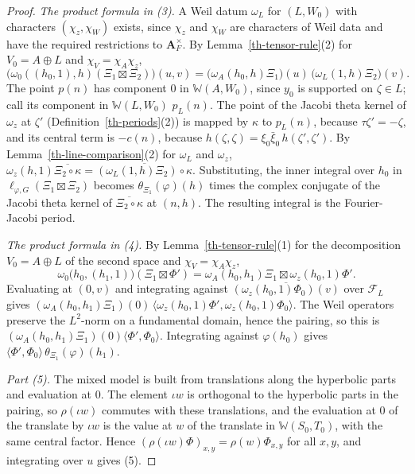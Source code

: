 \begin{proof}
\emph{The product formula in (3).} A Weil datum $\omega_L$ for $(L,W_0)$ with
characters $(\chi_z,\chi_W)$ exists, since $\chi_z$ and $\chi_W$ are characters
of Weil data and have the required restrictions to $\mathbf A_F^\times$. By
Lemma~\ref{th-tensor-rule}(2) for $V_0=A\oplus L$ and $\chi_V=\chi_A\chi_z$,
\[
\bigl(\omega_0((h_0,1),h)(\Xi_1\boxtimes\Xi_2)\bigr)(u,v)=\bigl(\omega_A(h_0,h)\Xi_1\bigr)(u)\,\bigl(\omega_L(1,h)\Xi_2\bigr)(v).
\]
The point $p(n)$ has component $0$ in $\mathbb W(A,W_0)$, since $y_0$ is
supported on $\zeta\in L$; call its component in $\mathbb W(L,W_0)$ $p_L(n)$.
The point of the Jacobi theta kernel of $\omega_z$ at $\zeta'$
(Definition~\ref{th-periods}(2)) is mapped by $\kappa$ to $p_L(n)$, because
$\tau\zeta'=-\zeta$, and its central term is $-c(n)$, because
$h(\zeta,\zeta)=\xi_0\bar\xi_0\,h(\zeta',\zeta')$. By
Lemma~\ref{th-line-comparison}(2) for $\omega_L$ and $\omega_z$,
$\omega_z(h,1)\overline{\Xi_2\circ\kappa}=\overline{(\omega_L(1,h)\Xi_2)\circ\kappa}$.
Substituting, the inner integral over $h_0$ in $\ell_{\varphi,G}(\Xi_1\boxtimes\Xi_2)$
becomes $\theta_{\Xi_1}(\varphi)(h)$ times the complex conjugate of the Jacobi
theta kernel of $\overline{\Xi_2\circ\kappa}$ at $(n,h)$. The resulting integral is
the Fourier-Jacobi period.

\emph{The product formula in (4).} By Lemma~\ref{th-tensor-rule}(1) for the
decomposition $V_0=A\oplus L$ of the second space and $\chi_V=\chi_A\chi_z$,
\[
\omega_0\bigl(h_0,(h_1,1)\bigr)(\Xi_1\boxtimes\Phi')=\omega_A(h_0,h_1)\Xi_1\boxtimes\omega_z(h_0,1)\Phi' .
\]
Evaluating at $(0,v)$ and integrating against
$\overline{(\omega_z(h_0,1)\Phi_0)(v)}$ over $\mathcal F_L$ gives
$(\omega_A(h_0,h_1)\Xi_1)(0)\,\langle\omega_z(h_0,1)\Phi',\omega_z(h_0,1)\Phi_0\rangle$.
The Weil operators preserve the $L^2$-norm on a fundamental domain, hence the
pairing, so this is $(\omega_A(h_0,h_1)\Xi_1)(0)\langle\Phi',\Phi_0\rangle$.
Integrating against $\varphi(h_0)$ gives
$\langle\Phi',\Phi_0\rangle\,\theta_{\Xi_1}(\varphi)(h_1)$.

\emph{Part (5).} The mixed model is built from translations along the
hyperbolic parts and evaluation at $0$. The element $\iota w$ is orthogonal to
the hyperbolic parts in the pairing, so $\rho(\iota w)$ commutes with these
translations, and the evaluation at $0$ of the translate by $\iota w$ is the
value at $w$ of the translate in $\mathbb W(S_0,T_0)$, with the same central
factor. Hence $(\rho(\iota w)\Phi)_{x,y}=\rho(w)\Phi_{x,y}$ for all $x,y$, and
integrating over $u$ gives (5).
\end{proof}

